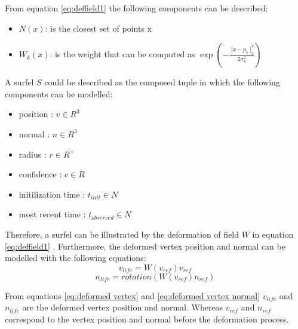 \documentclass[12pt]{report}
\begin{document}
From equation \ref{eq:deffield1} the following components can be described:
\begin{itemize}
  \item $N(x)$: is the closest set of points x
  \item $W_{k}(x)$:  is the weight that can be computed as $\exp{(-\frac{\ | {x-p_k} \ |^{2}_2 }{2\sigma^{2}_k})}$
\end{itemize}

A surfel $S$ could be described as the composed tuple in which the following components can be modelled:
\begin{itemize}
  \item position : $v \in R^3$ 
  \item  normal  : $n \in R^3$
  \item  radius : $r \in R^+$
  \item confidence : $c \in R$
  \item initilization time : $t_{init} \in N$
  \item most recent time : $t_{observed} \in N$ 
\end{itemize}
Therefore, a surfel can be illustrated by the deformation of field $W$ in equation \ref{eq:deffield1} \citep{SurfelWarp}.
Furthermore, the deformed vertex position  and normal can be modelled with the following equations:
\begin{equation}
  v_{life}=W(v_{ref})v_{ref}
  \label{eq:deformed vertex}
\end{equation}
\begin{equation}
  n_{life}=rotation(W(v_{ref})n_{ref})
  \label{eq:deformed vertex normal}
\end{equation}

From equations \ref{eq:deformed vertex} and \ref{eq:deformed vertex normal} $v_{life}$ and $n_{life}$ are the deformed vertex position and normal.
Whereas $v_{ref}$ and $n_{ref}$ correspond to the vertex position and normal before the deformation process. 
\enlargethispage{\baselineskip}
\end{document}
